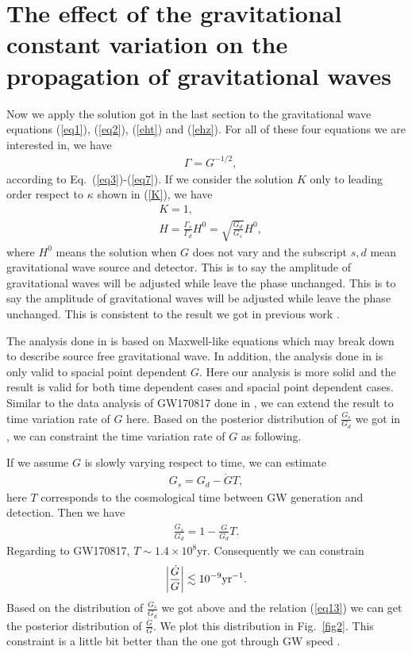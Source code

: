 \documentclass[prd,aps,a4paper,superscriptaddress,onecolumn,nofootinbib]{revtex4}
\begin{document}
\section{The effect of the gravitational constant variation on the propagation of gravitational waves}

Now we apply the solution got in the last section to the gravitational wave equations (\ref{eq1}), (\ref{eq2}), (\ref{eht}) and (\ref{ehz}). For all of these four equations we are interested in, we have
\begin{align}
&\Gamma=G^{-1/2},
\end{align}
according to Eq.~(\ref{eq3})-(\ref{eq7}). If we consider the solution $K$ only to leading order respect to $\kappa$ shown in (\ref{K}), we have
\begin{align}
&K=1,\\
&H=\frac{\Gamma_s}{\Gamma_d}H^0=\sqrt{\frac{G_d}{G_s}}H^0,
\end{align}
where $H^0$ means the solution when $G$ does not vary and the subscript $s,d$ mean gravitational wave source and detector. This is to say the amplitude of gravitational waves will be adjusted while leave the phase unchanged. This is to say the amplitude of gravitational waves will be adjusted while leave the phase unchanged. This is consistent to the result we got in previous work \cite{An}.

The analysis done in \cite{An} is based on Maxwell-like equations which may break down to describe source free gravitational wave. In addition, the analysis done in \cite{An} is only valid to spacial point dependent $G$. Here our analysis is more solid and the result is valid for both time dependent cases and spacial point dependent cases. Similar to the data analysis of GW170817 done in \cite{An}, we can extend the result to time variation rate of $G$ here. Based on the posterior distribution of $\frac{G_s}{G_d}$ we got in \cite{An}, we can constraint the time variation rate of $G$ as following.

If we assume $G$ is slowly varying respect to time, we can estimate
\begin{align}
G_s=G_d-\dot{G}T,
\end{align}
here $T$ corresponds to the cosmological time between GW generation and detection. Then we have
\begin{align}
\frac{G_s}{G_d}=1-\frac{\dot{G}}{G_d}T.\label{eq13}
\end{align}
Regarding to GW170817, $T\sim1.4\times10^8$yr. Consequently we can constrain
\begin{align}
\left|\frac{\dot{G}}{G}\right|\lesssim10^{-9}{\rm yr}^{-1}.
\end{align}
Based on the distribution of $\frac{G_s}{G_d}$ we got above and the relation (\ref{eq13}) we can get the posterior distribution of $\frac{\dot{G}}{G}$. We plot this distribution in Fig.~\ref{fig2}. This constraint is a little bit better than the one got through GW speed \cite{PhysRevLett.126.141104,WANG2022137416}.
\end{document}
